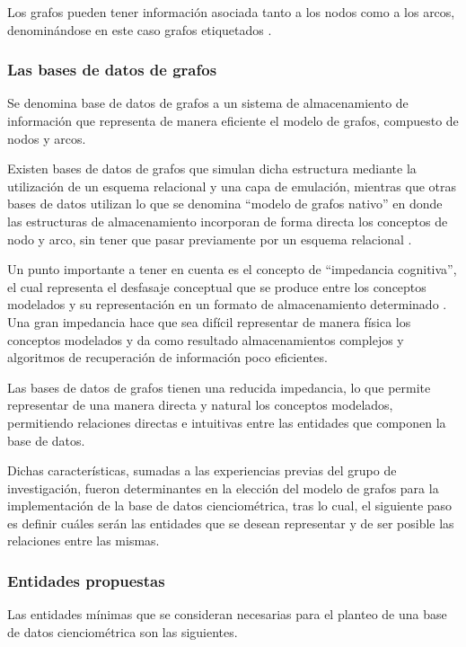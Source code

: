 Los grafos pueden tener información asociada tanto a los nodos como a los arcos, denominándose en este caso grafos etiquetados \cite{van2008handbook}. 

\subsubsection{Las bases de datos de grafos}

Se denomina base de datos de grafos a un sistema de almacenamiento de información que representa de manera eficiente el modelo de grafos, compuesto de nodos y arcos.

Existen bases de datos de grafos que simulan dicha estructura mediante la utilización de un esquema relacional y una capa de emulación, mientras que otras bases de datos utilizan lo que se denomina ``modelo de grafos nativo'' en donde las estructuras de almacenamiento incorporan de forma directa los conceptos de nodo y arco, sin tener que pasar previamente por un esquema relacional \cite{robinson2015graph}.

Un punto importante a tener en cuenta es el concepto de ``impedancia cognitiva'', el cual representa el desfasaje conceptual que se produce entre los conceptos modelados y su representación en un formato de almacenamiento determinado \cite{robinson2015graph}. Una gran impedancia hace que sea difícil representar de manera física los conceptos modelados y da como resultado almacenamientos complejos y algoritmos de recuperación de información poco eficientes.

Las bases de datos de grafos tienen una reducida impedancia, lo que permite representar de una manera directa y natural los conceptos modelados, permitiendo relaciones directas e intuitivas entre las entidades que componen la base de datos.

Dichas características, sumadas a las experiencias previas del grupo de investigación, fueron determinantes en la elección del modelo de grafos para la implementación de la base de datos cienciométrica, tras lo cual, el siguiente paso es definir cuáles serán las entidades que se desean representar y de ser posible las relaciones entre las mismas.

\subsubsection{Entidades propuestas}\label{sec:entidades}

Las entidades mínimas que se consideran necesarias para el planteo de una base de datos cienciométrica son las siguientes.

